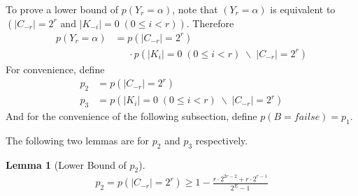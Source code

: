 \documentclass[10pt, conference, compsocconf]{IEEEtran}
\newtheorem{mylemma}{Lemma}
\begin{document}
        To prove a lower bound of $p(Y_r = \alpha)$, note that
        $(Y_r = \alpha)$ is equivalent to $\left(|C_{-r}| = 2^r \text{ and } |K_{-i}| = 0   \; (0 \leq i < r)\right)$.
        Therefore
        \begin{align*}
            p(Y_r = \alpha) &= p(|C_{-r}| = 2^r)\\
                & \;\;\;\;\; \cdot p(|K_i| = 0  \; (0 \leq i < r) \; \backslash \; |C_{-r}| = 2^r)
        \end{align*}
        For convenience, define
        \begin{align*}
        	p_2 &= p(|C_{-r}| = 2^r)\\
        	p_3 &= p(|K_i| = 0  \; (0 \leq i < r) \; \backslash \; |C_{-r}| = 2^r)
        \end{align*}
		And for the convenience of the following subsection, define $p(B = failse) = p_1$.
		
        The following two lemmas are for $p_2$ and $p_3$
        respectively.

        \begin{mylemma}[Lower Bound of $p_2$]
            \begin{align*}
                p_2 = p(|C_{-r}| = 2^r) \geq 1-\frac{r \cdot 2^{2r-2}+r \cdot 2^{r-1}}{2^E-1}
            \end{align*}
        \end{mylemma}
\end{document}
